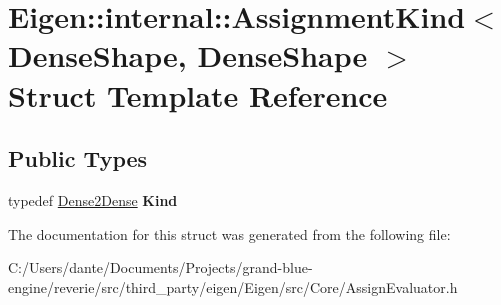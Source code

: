 \hypertarget{struct_eigen_1_1internal_1_1_assignment_kind_3_01_dense_shape_00_01_dense_shape_01_4}{}\section{Eigen\+::internal\+::Assignment\+Kind$<$ Dense\+Shape, Dense\+Shape $>$ Struct Template Reference}
\label{struct_eigen_1_1internal_1_1_assignment_kind_3_01_dense_shape_00_01_dense_shape_01_4}
\subsection*{Public Types}
\begin{DoxyCompactItemize}
\item 
\mbox{\label{struct_eigen_1_1internal_1_1_assignment_kind_3_01_dense_shape_00_01_dense_shape_01_4_a83f22c796a459812a94e5d3b5de66891}} 
typedef \mbox{\hyperlink{struct_eigen_1_1internal_1_1_dense2_dense}{Dense2\+Dense}} {\bfseries Kind}
\end{DoxyCompactItemize}


The documentation for this struct was generated from the following file\+:\begin{DoxyCompactItemize}
\item 
C\+:/\+Users/dante/\+Documents/\+Projects/grand-\/blue-\/engine/reverie/src/third\+\_\+party/eigen/\+Eigen/src/\+Core/Assign\+Evaluator.\+h\end{DoxyCompactItemize}
